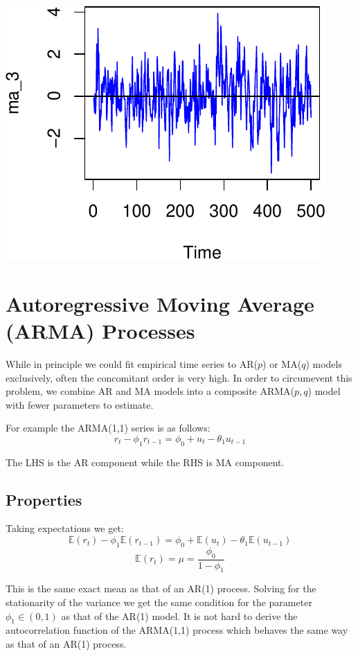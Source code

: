 \documentclass[11pt,]{article}
\begin{document}
\begin{center}\includegraphics{FMC_T4_PhD_ARMA_GARCH_files/figure-latex/MA-4} \end{center}

\section{Autoregressive Moving Average (ARMA)
Processes}\label{autoregressive-moving-average-arma-processes}

While in principle we could fit empirical time series to AR(\(p\)) or
MA(\(q\)) models exclusively, often the concomitant order is very high.
In order to circumevent this problem, we combine AR and MA models into a
composite ARMA(\(p,q\)) model with fewer parameters to estimate.

For example the ARMA(1,1) series is as follows:
\[r_t-\phi_1r_{t-1} = \phi_0 + u_t -\theta_1u_{t-1}\]

The LHS is the AR component while the RHS is MA component.

\subsection{Properties}\label{properties}

Taking expectations we get:
\[\mathbb{E}(r_t)-\phi_1\mathbb{E}(r_{t-1}) = \phi_0 + \mathbb{E}(u_t) - \theta_1\mathbb{E}(u_{t-1})\]
\[\mathbb{E}(r_t) = \mu = \frac{\phi_0}{1-\phi_1}\]

This is the same exact mean as that of an AR(1) process. Solving for the
stationarity of the variance we get the same condition for the parameter
\(\phi_1\in (0,1)\) as that of the AR(1) model. It is not hard to derive
the autocorrelation function of the ARMA(1,1) process which behaves the
same way as that of an AR(1) process.
\end{document}
